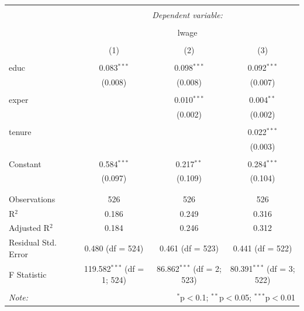 \documentclass[]{book}
\begin{document}
\begin{table}[!htbp] \centering 
  \caption{} 
  \label{} 
\begin{tabular}{@{\extracolsep{5pt}}lccc} 
\\[-1.8ex]\hline 
\hline \\[-1.8ex] 
 & \multicolumn{3}{c}{\textit{Dependent variable:}} \\ 
\cline{2-4} 
\\[-1.8ex] & \multicolumn{3}{c}{lwage} \\ 
\\[-1.8ex] & (1) & (2) & (3)\\ 
\hline \\[-1.8ex] 
 educ & 0.083$^{***}$ & 0.098$^{***}$ & 0.092$^{***}$ \\ 
  & (0.008) & (0.008) & (0.007) \\ 
  & & & \\ 
 exper &  & 0.010$^{***}$ & 0.004$^{**}$ \\ 
  &  & (0.002) & (0.002) \\ 
  & & & \\ 
 tenure &  &  & 0.022$^{***}$ \\ 
  &  &  & (0.003) \\ 
  & & & \\ 
 Constant & 0.584$^{***}$ & 0.217$^{**}$ & 0.284$^{***}$ \\ 
  & (0.097) & (0.109) & (0.104) \\ 
  & & & \\ 
\hline \\[-1.8ex] 
Observations & 526 & 526 & 526 \\ 
R$^{2}$ & 0.186 & 0.249 & 0.316 \\ 
Adjusted R$^{2}$ & 0.184 & 0.246 & 0.312 \\ 
Residual Std. Error & 0.480 (df = 524) & 0.461 (df = 523) & 0.441 (df = 522) \\ 
F Statistic & 119.582$^{***}$ (df = 1; 524) & 86.862$^{***}$ (df = 2; 523) & 80.391$^{***}$ (df = 3; 522) \\ 
\hline 
\hline \\[-1.8ex] 
\textit{Note:}  & \multicolumn{3}{r}{$^{*}$p$<$0.1; $^{**}$p$<$0.05; $^{***}$p$<$0.01} \\ 
\end{tabular} 
\end{table}
\end{document}
